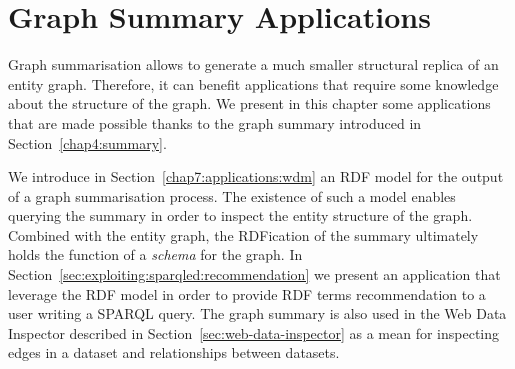 \chapter{Graph Summary Applications}
\label{chap:system}

Graph summarisation allows to generate a much smaller structural replica of an entity graph. Therefore, it can benefit applications that require some knowledge about the structure of the graph. We present in this chapter some applications that are made possible thanks to the graph summary introduced in Section~\ref{chap4:summary}.

We introduce in Section~\ref{chap7:applications:wdm} an RDF model for the output of a graph summarisation process. The existence of such a model enables querying the summary in order to inspect the entity structure of the graph. Combined with the entity graph, the RDFication of the summary ultimately holds the function of a \emph{schema} for the graph. In Section~\ref{sec:exploiting:sparqled:recommendation} we present an application that leverage the RDF model in order to provide RDF terms recommendation to a user writing a SPARQL query. The graph summary is also used in the Web Data Inspector described in Section~\ref{sec:web-data-inspector} as a mean for inspecting edges in a dataset and relationships between datasets.

